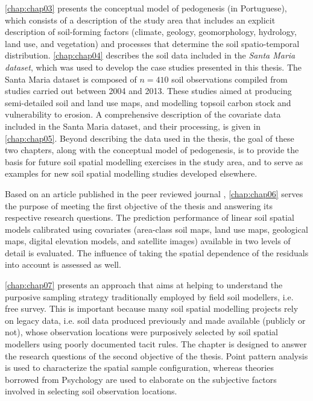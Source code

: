 \autoref{chap:chap03} presents the conceptual model of pedogenesis (in Portuguese), which consists 
of a description of the study area that includes an explicit description of soil-forming factors (climate, 
geology, geomorphology, hydrology, land use, and vegetation) and processes that determine the soil 
spatio-temporal distribution. \autoref{chap:chap04} describes the soil data included in the 
\emph{Santa Maria dataset}, which was used to develop the case studies presented in this thesis. The Santa
Maria dataset is composed of $n = 410$ soil observations compiled from studies carried out between \num{2004} 
and \num{2013}. These studies aimed at producing semi-detailed soil and land use maps, and modelling topsoil 
carbon stock and vulnerability to erosion. A comprehensive description of the covariate data included in the 
Santa Maria dataset, and their processing, is given in \autoref{chap:chap05}. Beyond describing 
the data used in the thesis, the goal of these two chapters, along with the conceptual model of pedogenesis, 
is 
to provide the basis for future soil spatial modelling exercises in the study area, and to serve as examples 
for new soil spatial modelling studies developed elsewhere.

Based on an article published in the peer reviewed journal \geoderma, \autoref{chap:chap06} serves 
the purpose of meeting the first objective of the thesis and answering its respective research questions. The 
prediction performance of linear soil spatial models calibrated using covariates (area-class soil maps, land 
use maps, geological maps, digital elevation models, and satellite images) available in two levels of detail 
is evaluated. The influence of taking the spatial dependence of the residuals into account is assessed as 
well. 

\autoref{chap:chap07} presents an approach that aims at helping to understand the purposive 
sampling strategy traditionally employed by field soil modellers, i.e. free survey. This is important because 
many soil spatial modelling projects rely on legacy data, i.e. soil data produced previously and made 
available 
(publicly or not), whose observation locations were purposively selected by soil spatial modellers using 
poorly documented tacit rules. The chapter is designed to answer the research questions of the second 
objective 
of the thesis. Point pattern analysis is used to characterize the spatial sample configuration, 
whereas theories borrowed from Psychology are used to elaborate on the subjective factors involved in 
selecting 
soil observation locations.

